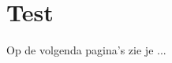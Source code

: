 \documentclass[dutch,dit,thesis]{hogentreport}
\begin{document}
\chapter{Test}

Op de volgenda pagina's zie je ...

%


\backmatter{}

\setlength\bibitemsep{2pt} %
\printbibliography[heading=bibintoc]
\end{document}
